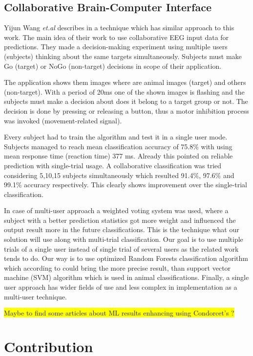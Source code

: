 \documentclass[12pt]{article}
\begin{document}
\subsection{Collaborative Brain-Computer Interface}

Yijun Wang {\it et.al} describes in \cite{collaborative_wang} a technique which has similar approach to this work. The main idea of their work to use collaborative EEG input data for predictions. They made a decision-making experiment using multiple users (subjects) thinking about the same targets simultaneously. Subjects must make Go (target) or NoGo (non-target) decisions in scope of their application. 

The application shows them images where are animal images (target) and others (non-target). With a period of 20ms one of the shown images is flashing and the subjects must make a decision about does it belong to a target group or not. The decision is done by pressing or releasing a button, thus a motor inhibition process was invoked (movement-related signal). 

Every subject had to train the algorithm and test it in a single user mode. Subjects managed to reach mean classification accuracy of 75.8\% with using mean response time (reaction time) 377 ms. Already this pointed on reliable prediction with single-trial usage. A collaborative classification was tried considering 5,10,15 subjects simultaneously which resulted 91.4\%, 97.6\% and 99.1\% accuracy respectively. This clearly shows improvement over the single-trial classification. 

In case of multi-user approach a weighted voting system was used, where a subject with a better prediction statistics got more weight and influenced the output result more in the future classifications. This is the technique what our solution will use along with multi-trial classification. Our goal is to use multiple trials of a single user instead of single trial of several users as the related work tends to do. Our way is to use optimized Random Forests classification algorithm which according to \cite{masso} could bring the more precise result, than support vector machine (SVM) algorithm which is used in animal classifications. Finally, a single user approach has wider fields of use and less complex in implementation as a multi-user technique.

\colorbox{yellow}{Maybe to find some articles about ML results enhancing using Condorcet's ?}

\newpage
\section{Contribution}
\end{document}
